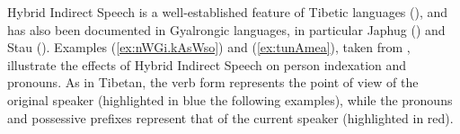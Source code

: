 \documentclass[11pt]{article}
\newcommand{\ipa}[1]{{\phon\textit{#1}}} %
\newcommand{\refb}[1]{(\ref{#1})}
\begin{document}
%
%
%
%   



Hybrid Indirect Speech is a well-established feature of Tibetic languages (\citealt{tournadre08conjunct}), and has also been documented in Gyalrongic languages, in particular Japhug (\citealt[241-244]{jacques16complementation}) and Stau (\citealt{jacques17stau}). Examples \refb{ex:nWGi.kAsWso} and \refb{ex:tunAmea}, taken from \citet[242-3]{jacques16complementation},  illustrate the effects of Hybrid Indirect Speech on person indexation and pronouns. As in Tibetan, the verb form represents the point of view of the original speaker (highlighted in blue the following examples), while the pronouns and possessive prefixes represent that of the current speaker (highlighted in red). 
\end{document}
